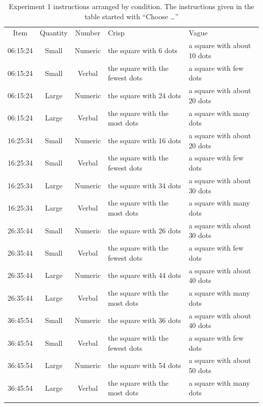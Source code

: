 \begin{table}[htbp]
\centering
\caption{Experiment 1 instructions arranged by condition. The instructions given in the table started with ``Choose \ldots''}
\label{instructionsC-exp-1}
\begin{tabular}{cccll}
\hline\noalign{\smallskip}
Item & Quantity & Number & Crisp & Vague\\
\noalign{\smallskip}\hline\noalign{\smallskip}
06:15:24 & Small & Numeric & the square with 6 dots & a square with about 10 dots\\
06:15:24 & Small & Verbal & the square with the fewest dots & a square with few dots\\
06:15:24 & Large & Numeric & the square with 24 dots & a square with about 20 dots\\
06:15:24 & Large & Verbal & the square with the most dots & a square with many dots\\
\noalign{\smallskip}\hline\noalign{\smallskip}
16:25:34 & Small & Numeric & the square with 16 dots & a square with about 20 dots\\
16:25:34 & Small & Verbal & the square with the fewest dots & a square with few dots\\
16:25:34 & Large & Numeric & the square with 34 dots & a square with about 30 dots\\
16:25:34 & Large & Verbal & the square with the most dots & a square with many dots\\
\noalign{\smallskip}\hline\noalign{\smallskip}
26:35:44 & Small & Numeric & the square with 26 dots & a square with about 30 dots\\
26:35:44 & Small & Verbal & the square with the fewest dots & a square with few dots\\
26:35:44 & Large & Numeric & the square with 44 dots & a square with about 40 dots\\
26:35:44 & Large & Verbal & the square with the most dots & a square with many dots\\
\noalign{\smallskip}\hline\noalign{\smallskip}
36:45:54 & Small & Numeric & the square with 36 dots & a square with about 40 dots\\
36:45:54 & Small & Verbal & the square with the fewest dots & a square with few dots\\
36:45:54 & Large & Numeric & the square with 54 dots & a square with about 50 dots\\
36:45:54 & Large & Verbal & the square with the most dots & a square with many dots\\
\noalign{\smallskip}\hline
\end{tabular}
\end{table}

